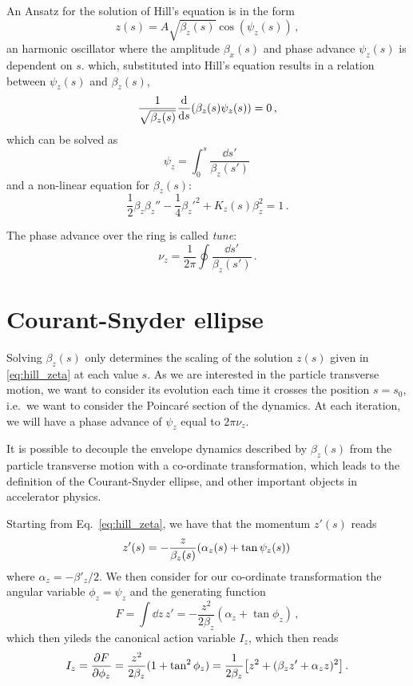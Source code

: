 An Ansatz for the solution of Hill's equation is in the form
\begin{equation}
	z(s)=A\sqrt{\beta_z(s)}\cos\left(\psi_z(s)\right)\,,
	\label{eq:hill_zeta}
\end{equation}
%
\ie an harmonic oscillator where the amplitude $\beta_x(s)$ and phase advance $\psi_z(s)$ is dependent on $s$. which, substituted into Hill's equation results in a relation between $\psi_z(s)$ and $\beta_z(s)$,
%
\begin{equation}
	\frac{1}{\sqrt{\beta_z(s)}} \dv{s}(\beta_z(s)\psi_z(s)) = 0\,,
\end{equation}
%
which can be solved as
%
\begin{equation}
	\psi_z = \int_0^s \frac{\dd s'}{\beta_z(s')}\,
\end{equation}
%
and a non-linear equation for $\beta_z(s)$:
%
\begin{equation}
	\frac{1}{2}\beta_z\beta_z''-\frac{1}{4}\beta_z'^2+K_z(s)\beta_z^2=1\,.
\end{equation}

The phase advance over the ring is called \textit{tune}:
\begin{equation}
	\nu_z = \frac{1}{2\pi}\oint \frac{\dd s'}{\beta_z(s')}\,.
    \label{eq:tune_def}
\end{equation} 


\section{Courant-Snyder ellipse}

Solving $\beta_z(s)$ only determines the scaling of the solution $z(s)$ given in \eqref{eq:hill_zeta} at each value $s$. As we are interested in the particle transverse motion, we want to consider its evolution each time it crosses the position $s=s_0$, i.e.\ we want to consider the Poincaré section of the dynamics. At each iteration, we will have a phase advance of $\psi_z$ equal to $2\pi\nu_z$.

It is possible to decouple the envelope dynamics described by $\beta_z(s)$ from the particle transverse motion with a co-ordinate transformation, which leads to the definition of the Courant-Snyder ellipse, and other important objects in accelerator physics.

Starting from Eq.~\eqref{eq:hill_zeta}, we have that the momentum $z'(s)$ reads
%
\begin{equation}
	z'(s)=-\frac{z}{\beta_z(s)}\qty(\alpha_z(s)+\tan\psi_z(s))\,
\end{equation}
%
where $\alpha_z=-\beta'_z/2$. We then consider for our co-ordinate transformation the angular variable $\phi_z=\psi_z$ and the generating function
%
\begin{equation}
	F=\int \dd z\, z' = -\frac{z^2}{2\beta_z}(\alpha_z+\tan\phi_z) \,,
\end{equation}
%
which then yileds the canonical action variable $I_z$, which then reads
%
\begin{equation}
	I_z=\pdv{F}{\phi_z}=\frac{z^2}{2\beta_z}(1+\tan^2\phi_z)=\frac{1}{2\beta_z}\qty[z^2+(\beta_z z'+\alpha_z z)^2]\,.
	\label{eq:jz}
\end{equation}

